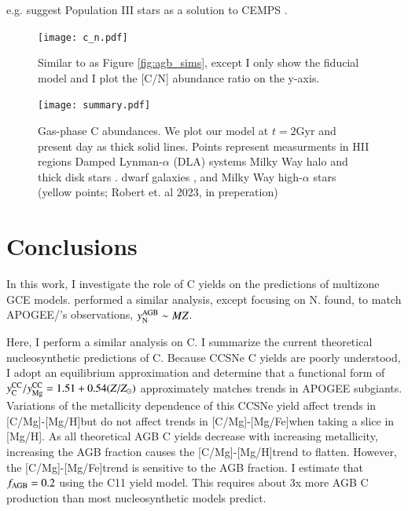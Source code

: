 \documentclass[12pt,oneside]{report}
\newcommand{\caah}{[C/Mg]-[Mg/H]}
\newcommand{\caafe}{[C/Mg]-[Mg/Fe]}
\newcommand{\Ycc}{\ensuremath{y_{\rm C}^{\rm CC}}}
\newcommand{\Yoc}{\ensuremath{y_{\rm Mg}^{\rm CC}}}
\newcommand{\citealtjack}{Robert et. al 2023, in preperation}
\begin{document}
e.g. \cite{cooke+17} suggest Population III stars as a solution to CEMPS \cite{FN15}.


\begin{figure}
    \texttt{[image: c\_n.pdf]}
    \caption{Similar to as Figure \ref{fig:agb_sims}, except I only show the fiducial model and I plot the [C/N] abundance ratio on the y-axis.
    }
\end{figure}

\begin{figure}
\centering
\texttt{[image: summary.pdf]}
\caption[Gas phase abundances]{Gas-phase C abundances. We plot our model at $t=2$Gyr and present day as thick solid lines. Points represent measurments in 
    HII regions    \citep[pink circles;][]{skillman+20, esteban+02, esteban+09, esteban+14, esteban+19}
    Damped Lynman-$\alpha$ (DLA) systems \citep[blue triangles;][]{cooke+17} 
    Milky Way halo and thick disk stars \citep[green stars;][]{nissen+14, fabbian+09}. 
    dwarf galaxies \citep[red diamonds;]{berg+19},
    and Milky Way high-$\alpha$ stars (yellow points; \citealtjack)
}
\label{fig:gas_phase}
\end{figure}


\chapter{Conclusions}

In this work, I investigate the role of C yields on the predictions of multizone GCE models. \citet{james+22} performed a similar analysis, except focusing on N. \citet{james+22} found, to match APOGEE/\citet{fiorenzo+21}'s observations, $y_{\rm N}^{\rm AGB} \sim M Z$. 

Here, I perform a similar analysis on C. I summarize the current theoretical nucleosynthetic predictions of C. Because CCSNe C yields are poorly understood, I adopt an equilibrium approximation and determine that a functional form of $\Ycc/\Yoc=1.51 + 0.54 (Z/Z_\odot)$ approximately matches trends in APOGEE subgiants. Variations of the metallicity dependence of this CCSNe yield affect trends in \caah but do not affect trends in \caafe when taking a slice in [Mg/H]. As all theoretical AGB C yields decrease with increasing metallicity, increasing the AGB fraction causes the \caah trend to flatten. However, the \caafe trend is sensitive to the AGB fraction. 
I estimate that $f_{\rm AGB} = 0.2$ using the C11 yield model. This requires about 3x more AGB C production than most nucleosynthetic models predict.
\end{document}
